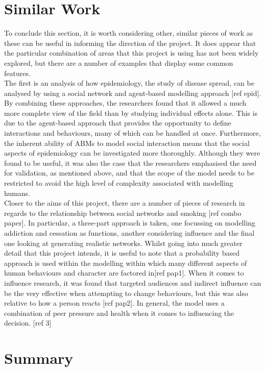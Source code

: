 \documentclass[]{report}
\begin{document}
\section{Similar Work}
To conclude this section, it is worth considering other, similar pieces of work as these can be useful in informing the direction of the project. It does appear that the particular combination of areas that this project is using has not been widely explored, but there are a number of examples that display some common features. \\
The first is an analysis of how epidemiology, the study of disease spread, can be analysed by using a social network and agent-based modelling approach [ref epid]. By combining these approaches, the researchers found that it allowed a much more complete view of the field than by studying individual effects alone. This is due to the agent-based approach that provides the opportunity to define interactions and behaviours, many of which can be handled at once. Furthermore, the inherent ability of ABMs to model social interaction means that the social aspects of epidemiology can be investigated more thoroughly. Although they were found to be useful, it was also the case that the researchers emphasised the need for validation, as mentioned above, and that the scope of the model needs to be restricted to avoid the high level of complexity associated with modelling humans. \\
Closer to the aims of this project, there are a number of pieces of research in regards to the relationship between social networks and smoking [ref combo paper]. In particular, a three-part approach is taken, one focussing on modelling addiction and cessation as functions, another considering influence and the final one looking at generating realistic networks. Whilst going into much greater detail that this project intends, it is useful to note that a probability based approach is used within the modelling within which many different aspects of human behaviours and character are factored in[ref pap1]. When it comes to influence research, it was found that targeted audiences and indirect influence can be the very effective when attempting to change behaviours, but this was also relative to how a person reacts [ref pap2]. In general, the model uses a combination of peer pressure and health when it comes to influencing the decision. [ref 3]
\section{Summary}
\end{document}
